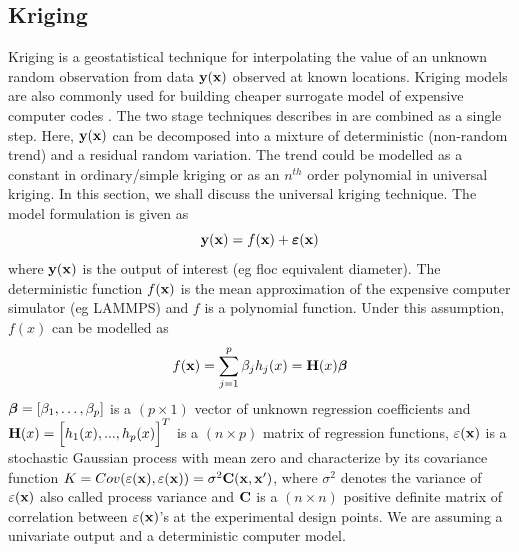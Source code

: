 \subsection{Kriging}
Kriging is a geostatistical technique for interpolating the value of an unknown random observation from data ${\bf y}({\bf x})$ observed at known locations. Kriging models are also commonly used for building cheaper surrogate model of expensive computer codes \cite{pd1,pd2, pd3,pd6}. The two stage techniques describes in \citet{pd11} are combined as a single step. Here, ${\bf y}({\bf x})$ can be decomposed into a mixture of deterministic (non-random trend) and a residual random variation. The trend could be modelled as a constant in ordinary/simple kriging or as an $n^{th}$ order polynomial in universal kriging. In this section, we shall discuss the universal kriging technique. The model formulation is given as
\begin{equation}\label{geneq2}
{\bf y}({\bf x})= f({\bf x}) + \boldsymbol \varepsilon({\bf x})
\end{equation}
where ${\bf y}({\bf x})$ is the output of interest (eg floc equivalent diameter). The deterministic function $f({\bf x})$ is the mean approximation of the expensive computer simulator (eg LAMMPS) and $f$ is a polynomial function. Under this assumption, $f(x)$ can be modelled as
\begin{equation}
f({\bf x}) = \sum_{j=1}^{p} \beta_j h_j(x) ={\bf H}(x) {\boldsymbol{\beta}}
\end{equation}
${\boldsymbol{\beta}}=[\beta_1,\ldots,\beta_p]$ is a $(p\times 1)$ vector of unknown regression coefficients and ${\bf H}(x) = \Big[h_1(x), . . . , h_p(x)\Big]^T$ is a $(n\times p)$ matrix of regression functions,
$\varepsilon({\bf x})$ is a stochastic Gaussian process with mean zero and characterize by its covariance function
$K=Cov(\varepsilon({\bf x}),\varepsilon({\bf x})) = \sigma^2{\bf C}({\bf x},{\bf x}')$, where $\sigma^2$ denotes the variance of $\varepsilon({\bf x})$ also called process variance and ${\bf C}$ is a $(n\times n)$ positive definite matrix of correlation between $\varepsilon({\bf x})$'s at the experimental design points. We are assuming a univariate output and a deterministic computer model.

